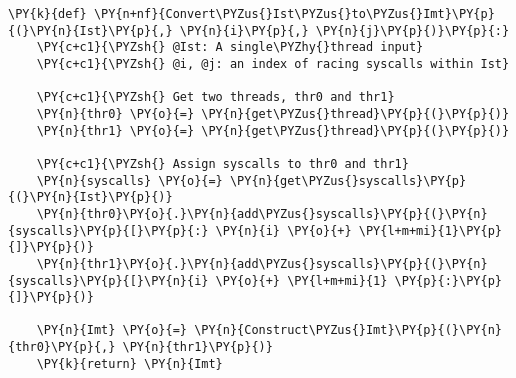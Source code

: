 \begin{Verbatim}[commandchars=\\\{\},codes={\catcode`\$=3\catcode`\^=7\catcode`\_=8\relax}]
\PY{k}{def} \PY{n+nf}{Convert\PYZus{}Ist\PYZus{}to\PYZus{}Imt}\PY{p}{(}\PY{n}{Ist}\PY{p}{,} \PY{n}{i}\PY{p}{,} \PY{n}{j}\PY{p}{)}\PY{p}{:}
    \PY{c+c1}{\PYZsh{} @Ist: A single\PYZhy{}thread input}
    \PY{c+c1}{\PYZsh{} @i, @j: an index of racing syscalls within Ist}

    \PY{c+c1}{\PYZsh{} Get two threads, thr0 and thr1}
    \PY{n}{thr0} \PY{o}{=} \PY{n}{get\PYZus{}thread}\PY{p}{(}\PY{p}{)}
    \PY{n}{thr1} \PY{o}{=} \PY{n}{get\PYZus{}thread}\PY{p}{(}\PY{p}{)}

    \PY{c+c1}{\PYZsh{} Assign syscalls to thr0 and thr1}
    \PY{n}{syscalls} \PY{o}{=} \PY{n}{get\PYZus{}syscalls}\PY{p}{(}\PY{n}{Ist}\PY{p}{)}
    \PY{n}{thr0}\PY{o}{.}\PY{n}{add\PYZus{}syscalls}\PY{p}{(}\PY{n}{syscalls}\PY{p}{[}\PY{p}{:} \PY{n}{i} \PY{o}{+} \PY{l+m+mi}{1}\PY{p}{]}\PY{p}{)}
    \PY{n}{thr1}\PY{o}{.}\PY{n}{add\PYZus{}syscalls}\PY{p}{(}\PY{n}{syscalls}\PY{p}{[}\PY{n}{i} \PY{o}{+} \PY{l+m+mi}{1} \PY{p}{:}\PY{p}{]}\PY{p}{)}

    \PY{n}{Imt} \PY{o}{=} \PY{n}{Construct\PYZus{}Imt}\PY{p}{(}\PY{n}{thr0}\PY{p}{,} \PY{n}{thr1}\PY{p}{)}
    \PY{k}{return} \PY{n}{Imt}
\end{Verbatim}
